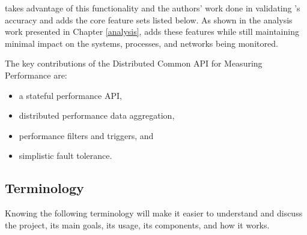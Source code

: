 \dcamp takes advantage of this functionality and the authors' work done in validating \campns's accuracy and adds the
core feature sets listed below. As shown in the analysis work presented in Chapter \ref{analysis}, \dcamp adds these
features while still maintaining minimal impact on the systems, processes, and networks being monitored.

The key contributions of the Distributed Common API for Measuring Performance are:

\begin{itemize}
\item a stateful performance API,
\item distributed performance data aggregation,
\item performance filters and triggers, and
\item simplistic fault tolerance.
\end{itemize}

\subsection{Terminology}
Knowing the following terminology will make it easier to understand and discuss the \dcamp project, its main goals, its
usage, its components, and how it works. 

